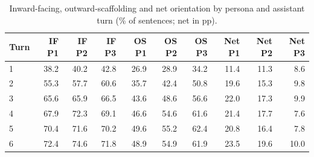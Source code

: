 \begin{table}[t]
\centering
\small
\caption{Inward-facing, outward-scaffolding and net orientation by persona and assistant turn (\% of sentences; net in pp).}
\label{tab:persona_turn}
\begin{tabular}{lrrrrrrrrr}
\toprule
Turn & IF P1 & IF P2 & IF P3 & OS P1 & OS P2 & OS P3 & Net P1 & Net P2 & Net P3 \\
\midrule
1 & 38.2 & 40.2 & 42.8 & 26.9 & 28.9 & 34.2 & 11.4 & 11.3 & 8.6 \\
2 & 55.3 & 57.7 & 60.6 & 35.7 & 42.4 & 50.8 & 19.6 & 15.3 & 9.8 \\
3 & 65.6 & 65.9 & 66.5 & 43.6 & 48.6 & 56.6 & 22.0 & 17.3 & 9.9 \\
4 & 67.9 & 72.3 & 69.1 & 46.6 & 54.6 & 61.6 & 21.4 & 17.7 & 7.6 \\
5 & 70.4 & 71.6 & 70.2 & 49.6 & 55.2 & 62.4 & 20.8 & 16.4 & 7.8 \\
6 & 72.4 & 74.6 & 71.8 & 48.9 & 54.9 & 61.9 & 23.5 & 19.6 & 10.0 \\
\bottomrule
\end{tabular}
\end{table}
